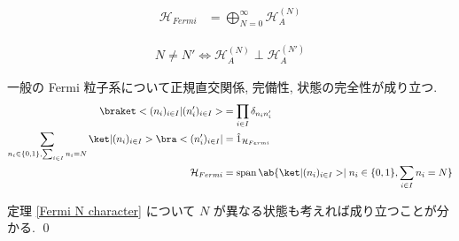 \documentclass[uplatex,dvipdfmx,a4paper,11pt]{jlreq}
\makeatletter
\DeclareMathOperator{\Span}{span}
\newcommand{\HH}{\mathcal{H}}
\numberwithin{equation}{section}
\theoremstyle{definition}
\renewenvironment{proof}[1][\proofname]{\par
  \normalfont
  \topsep6\p@\@plus6\p@ \trivlist
  \item[\hskip\labelsep{\bfseries #1}\@addpunct{\bfseries}]\ignorespaces\quad\par
}{%
  \qed\endtrivlist\@endpefalse
}
\renewcommand\proofname{証明}
\makeatother
\begin{document}
\begin{definition}
  \begin{align}
    \HH_{Fermi} & = \bigoplus_{N = 0}^{\infty} \HH_A^{(N)}
  \end{align}

  \begin{align}
    N\neq N' \iff \HH_A^{(N)}\perp\HH_A^{(N')}
  \end{align}
\end{definition}
\begin{theorem}
  一般の Fermi 粒子系について正規直交関係, 完備性, 状態の完全性が成り立つ.
  \begin{align}
    \braket<(n_i)_{i\in I}|(n_i')_{i\in I}>                                               & = \prod_{i\in I}\delta_{n_in_i'}                                              \\
    \sum_{n_i\in\{0, 1\}, \sum_{i\in I}n_i = N} \ket|(n_i)_{i\in I}>\bra<(n_i')_{i\in I}| & = \hat{1}_{\HH_{Fermi}}                                                       \\
    \HH_{Fermi}                                                                           & = \Span\ab\{\ket|(n_i)_{i\in I}> \mid n_i\in\{0, 1\}, \sum_{i\in I}n_i = N \}
  \end{align}
\end{theorem}
\begin{proof}
  定理 \ref{Fermi N character} について $N$ が異なる状態も考えれば成り立つことが分かる.
\end{proof}
\end{document}

